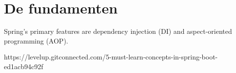 \chapter{De fundamenten}



Spring’s primary features are dependency injection (DI) and aspect-oriented
programming (AOP).






https://levelup.gitconnected.com/5-must-learn-concepts-in-spring-boot-ed1acb94c92f